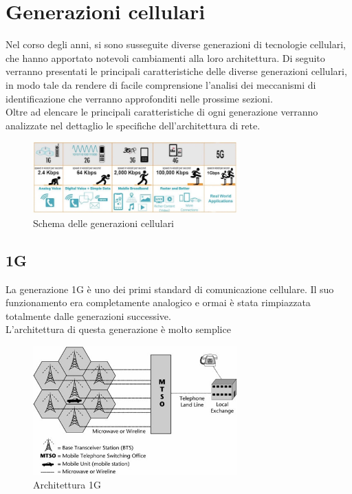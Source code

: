 \section{Generazioni cellulari}
Nel corso degli anni, si sono susseguite diverse generazioni di tecnologie cellulari, che hanno apportato
notevoli cambiamenti alla loro architettura. Di seguito verranno presentati le principali caratteristiche
delle diverse generazioni cellulari, in modo tale da rendere di facile comprensione l'analisi dei meccanismi
di identificazione che verranno approfonditi nelle prossime sezioni.\\
Oltre ad elencare le principali caratteristiche di ogni generazione verranno analizzate nel dettaglio le specifiche  
dell'architettura di rete.
\begin{figure}[h]
    \centering
    \includegraphics[width=0.7\textwidth]{images/generations-scheme.jpg}
    \caption{Schema delle generazioni cellulari}
\end{figure}

\subsection{1G}
La generazione 1G è uno dei primi standard di comunicazione cellulare. Il suo funzionamento era completamente analogico 
e ormai è stata rimpiazzata totalmente dalle generazioni successive.\\
L'architettura di questa generazione è molto semplice
\begin{figure}[h]
    \centering
    \includegraphics[width=0.7\textwidth]{images/1g.jpg}
    \caption{Architettura 1G}
\end{figure}


